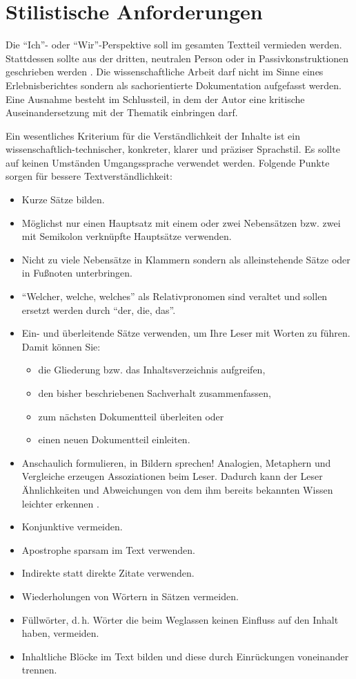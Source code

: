 \section{Stilistische Anforderungen}
Die "`Ich"'- oder "`Wir"'-Perspektive soll im gesamten Textteil vermieden werden.
Stattdessen sollte aus der dritten, neutralen Person oder in Passivkonstruktionen geschrieben werden \cite[S.~130]{Hering2009}.
Die wissenschaftliche Arbeit darf nicht im Sinne eines Erlebnisberichtes sondern als sachorientierte Dokumentation aufgefasst werden. 
Eine Ausnahme besteht im Schlussteil, in dem der Autor eine kritische Auseinandersetzung mit der Thematik einbringen darf.

Ein wesentliches Kriterium für die Verständlichkeit der Inhalte ist ein wissenschaftlich-technischer, konkreter, klarer und präziser Sprachstil.
Es sollte auf keinen Umständen Umgangssprache verwendet werden. 
Folgende Punkte sorgen für bessere Textverständlichkeit:
\begin{itemize}
	\item Kurze Sätze bilden.
	\item Möglichst nur einen Hauptsatz mit einem oder zwei Nebensätzen bzw. zwei mit Semikolon verknüpfte Hauptsätze verwenden. 
	\item Nicht zu viele Nebensätze in Klammern sondern als alleinstehende Sätze oder in Fußnoten unterbringen.
	\item "`Welcher, welche, welches"' als Relativpronomen sind veraltet und sollen ersetzt werden durch "`der, die, das"'. 
	\item Ein- und überleitende Sätze verwenden, um Ihre Leser mit Worten zu führen.
Damit können Sie:\\
\begin{itemize}
	\item die Gliederung bzw. das Inhaltsverzeichnis aufgreifen,
	\item den bisher beschriebenen Sachverhalt zusammenfassen,
	\item zum nächsten Dokumentteil überleiten oder
	\item einen neuen Dokumentteil einleiten.
\end{itemize}
	\item Anschaulich formulieren, in Bildern sprechen!
	Analogien, Metaphern und Vergleiche erzeugen Assoziationen beim Leser.
	Dadurch kann der Leser Ähnlichkeiten und Abweichungen von dem ihm bereits bekannten Wissen leichter erkennen \cite[S.~129]{Hering2009}.
	\item Konjunktive vermeiden.
	\item Apostrophe sparsam im Text verwenden.
	\item Indirekte statt direkte Zitate verwenden.
	\item Wiederholungen von Wörtern in Sätzen vermeiden.
	\item Füllwörter, d.\,h. Wörter die beim Weglassen keinen Einfluss auf den Inhalt haben, vermeiden.
	\item Inhaltliche Blöcke im Text bilden und diese durch Einrückungen voneinander trennen.
\end{itemize}

